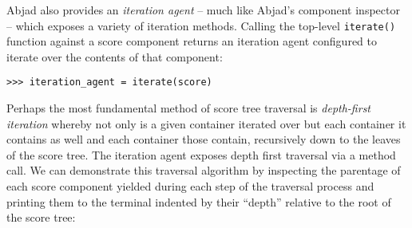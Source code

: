 \noindent Abjad also provides an \emph{iteration agent} -- much like Abjad's
component inspector -- which exposes a variety of iteration methods. Calling
the top-level \texttt{iterate()} function against a score component returns an
iteration agent configured to iterate over the contents of that component:

\begin{comment}
<abjad>
iteration_agent = iterate(score)
</abjad>
\end{comment}

\begin{abjadbookoutput}
\begin{singlespacing}
\vspace{-0.5\baselineskip}
\begin{lstlisting}
>>> iteration_agent = iterate(score)
\end{lstlisting}
\end{singlespacing}
\end{abjadbookoutput}

\noindent Perhaps the most fundamental method of score tree traversal is
\emph{depth-first iteration}\cite{cormen2009introduction} whereby not only is a
given container iterated over but each container it contains as well and each
container those contain, recursively down to the leaves of the score tree. The
iteration agent exposes depth first traversal via a method call. We can
demonstrate this traversal algorithm by inspecting the parentage of each score
component yielded during each step of the traversal process and printing them
to the terminal indented by their \enquote{depth} relative to the root of the
score tree:

\begin{comment}
<abjad>
for component in iteration_agent.depth_first():
    parentage = inspect_(component).get_parentage()
    component_depth = parentage.depth
    indent = '    ' * component_depth
    string = '{}{}'.format(indent, repr(component))
    print(string)

</abjad>
\end{comment}

